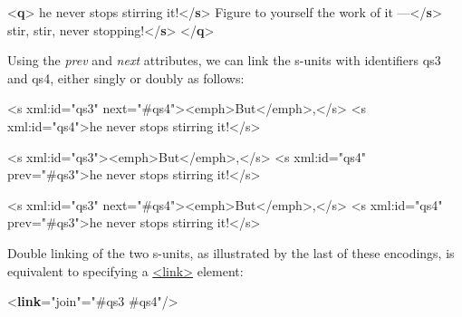 \begin{shaded}
{<\textbf{q}>}\mbox{}\newline 
{}he never stops stirring it!{</\textbf{s}>}\mbox{}\newline 
{}Figure to yourself the work of it —{</\textbf{s}>}\mbox{}\newline 
{}stir, stir, never stopping!{</\textbf{s}>}\mbox{}\newline 
{</\textbf{q}>}\end{shaded}\egroup\par \noindent  \par
Using the {\itshape prev} and {\itshape next} attributes, we can link the s-units with identifiers qs3 and qs4, either singly or doubly as follows: \par\hfill\bgroup\exampleFont\vskip 10pt\begin{shaded}
\obeyspaces   <s xml:id="qs3" next="\#qs4"><emph>But</emph>,</s>\newline
  <s xml:id="qs4">he never stops stirring it!</s>\end{shaded}
\par\egroup 
 \par\hfill\bgroup\exampleFont\vskip 10pt\begin{shaded}
\obeyspaces   <s xml:id="qs3"><emph>But</emph>,</s>\newline
  <s xml:id="qs4" prev="\#qs3">he never stops stirring it!</s>\end{shaded}
\par\egroup 
 \par\hfill\bgroup\exampleFont\vskip 10pt\begin{shaded}
\obeyspaces   <s xml:id="qs3" next="\#qs4"><emph>But</emph>,</s>\newline
  <s xml:id="qs4" prev="\#qs3">he never stops stirring it!</s>\end{shaded}
\par\egroup 
 Double linking of the two s-units, as illustrated by the last of these encodings, is equivalent to specifying a \hyperref[TEI.link]{<link>} element: \par\bgroup{}\exampleFont \begin{shaded}\noindent\mbox{}{<\textbf{link}\hspace*{1em}{type}="{join}"\hspace*{1em}{target}="{\#qs3 \#qs4}"/>}\end{shaded}\egroup\par \par
